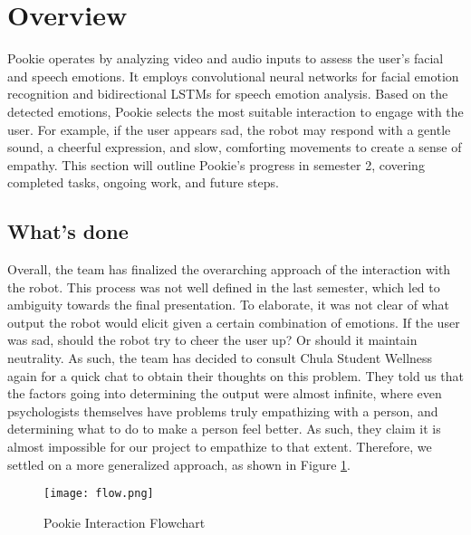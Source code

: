 \section{Overview}
Pookie operates by analyzing video and audio inputs to assess the user's facial and speech emotions. It employs convolutional neural networks for facial emotion recognition and bidirectional LSTMs for speech emotion analysis. Based on the detected emotions, Pookie selects the most suitable interaction to engage with the user. For example, if the user appears sad, the robot may respond with a gentle sound, a cheerful expression, and slow, comforting movements to create a sense of empathy. This section will outline Pookie’s progress in semester 2, covering completed tasks, ongoing work, and future steps.
\subsection{What’s done}
Overall, the team has finalized the overarching approach of the interaction with the robot. This process was not well defined in the last semester, which led to ambiguity towards the final presentation. To elaborate, it was not clear of what output the robot would elicit given a certain combination of emotions. If the user was sad, should the robot try to cheer the user up? Or should it maintain neutrality. As such, the team has decided to consult Chula Student Wellness again for a quick chat to obtain their thoughts on this problem. They told us that the factors going into determining the output were almost infinite, where even psychologists themselves have problems truly empathizing with a person, and determining what to do to make a person feel better. As such, they claim it is almost impossible for our project to empathize to that extent. Therefore, we settled on a more generalized approach, as shown in Figure \ref{fig:flow}.

\begin{figure}[ht]
    \centering
    \texttt{[image: flow.png]}
    \caption{Pookie Interaction Flowchart}
    \label{fig:flow}
\end{figure}


